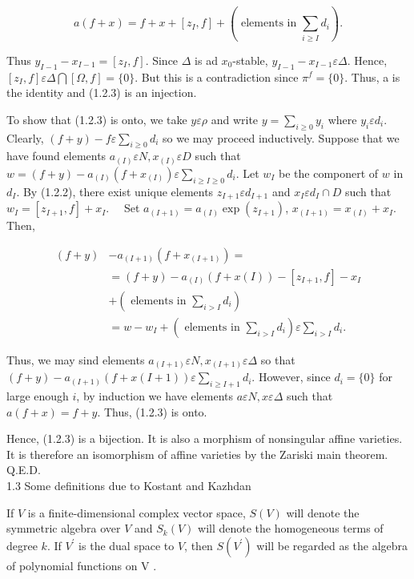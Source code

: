 \documentclass[10pt]{article}
\begin{document}
\begin{equation*}
a(f+x)=f+x+\left[z_{I}, f\right]+\left(\text { elements in } \sum_{i \geq I} d_{i}\right) . \tag{1.2.4}
\end{equation*}


Thus $y_{I-1}-x_{I-1}=\left[z_{I}, f\right]$. Since $\Delta$ is ad $x_{0}$-stable, $y_{I-1}-x_{I-1} \varepsilon \Delta$. Hence, $\left[z_{I}, f\right] \varepsilon \Delta \bigcap[\Omega, f]=\{0\}$. But this is a contradiction since $\pi^{f}=\{0\}$. Thus, a is the identity and (1.2.3) is an injection.

To show that (1.2.3) is onto, we take $y \varepsilon \rho$ and write $y=\sum_{i \geq 0} y_{i}$ where $y_{i} \varepsilon d_{i}$. Clearly, $(f+y)-f \varepsilon \sum_{i \geq 0} d_{i}$ so we may proceed inductively. Suppose that we have found elements $a_{(I)} \varepsilon N, x_{(I)} \varepsilon D$ such that\\
$w=(f+y)-a_{(I)}\left(f+x_{(I)}\right) \varepsilon \sum_{i \geq I \geq 0} d_{i}$. Let $w_{I}$ be the componert of $w$ in $d_{I}$. By (1.2.2), there exist unique elements $z_{I+1} \varepsilon d_{I+1}$ and $x_{I} \varepsilon d_{I} \cap D$ such that $w_{I}=\left[z_{I+1}, f\right]+x_{I} . \quad$ Set $a_{(I+1)}=a_{(I)} \exp \left(z_{I+1}\right)$, $x_{(I+1)}=x_{(I)}+x_{I}$. Then,

$$
\begin{aligned}
(f+y) & -a_{(I+1)}\left(f+x_{(I+1)}\right)= \\
& =(f+y)-a_{(I)}(f+x(I))-\left[z_{I+1}, f\right]-x_{I} \\
& +\left(\text { elements in } \sum_{i>I} d_{i}\right) \\
& =w-w_{I}+\left(\text { elements in } \sum_{i>I} d_{i}\right) \varepsilon \sum_{i>I} d_{i} .
\end{aligned}
$$

Thus, we may sind elements $a_{(I+1)} \varepsilon N, x_{(I+1)} \varepsilon \Delta$ so that $(f+y)-a_{(I+1)}(f+x(I+1)) \varepsilon \sum_{i \geq I+1} d_{i}$. However, since $d_{i}=\{0\}$ for large enough $i$, by induction we have elements $a \varepsilon N, x \varepsilon \Delta$ such that $a(f+x)=f+y$. Thus, (1.2.3) is onto.

Hence, (1.2.3) is a bijection. It is also a morphism of nonsingular affine varieties. It is therefore an isomorphism of affine varieties by the Zariski main theorem. Q.E.D.\\
1.3 Some definitions due to Kostant and Kazhdan

If $V$ is a finite-dimensional complex vector space, $S(V)$ will denote the symmetric algebra over $V$ and $S_{k}(V)$ will denote the homogeneous terms of degree $k$. If $V^{\prime}$ is the dual space to $V$, then $S\left(V^{\prime}\right)$ will be regarded as the algebra of polynomial functions on V .
\end{document}
